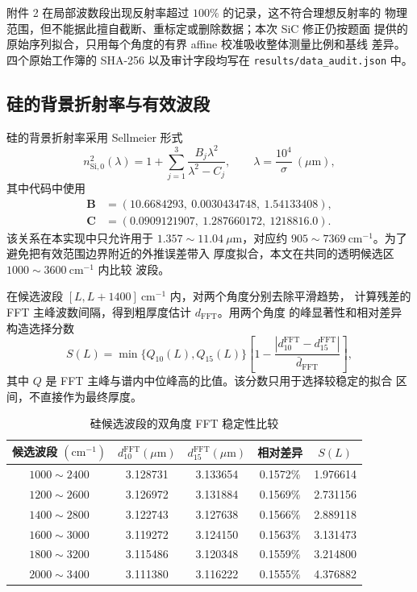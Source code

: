 \documentclass[UTF8,12pt,a4paper]{ctexart}
\begin{document}
附件 2 在局部波数段出现反射率超过 $100\%$ 的记录，这不符合理想反射率的
物理范围，但不能据此擅自截断、重标定或删除数据；本次 SiC 修正仍按题面
提供的原始序列拟合，只用每个角度的有界 affine 校准吸收整体测量比例和基线
差异。四个原始工作簿的 SHA-256 以及审计字段均写在
\verb|results/data_audit.json| 中。

\subsection{硅的背景折射率与有效波段}

硅的背景折射率采用 Sellmeier 形式
\begin{equation}
  n_{\mathrm{Si},0}^2(\lambda)=1+\sum_{j=1}^{3}
  \frac{B_j\lambda^2}{\lambda^2-C_j},
  \qquad \lambda=\frac{10^4}{\sigma}\ (\mu\mathrm{m}),
  \label{eq:sellmeier}
\end{equation}
其中代码中使用
\[
\begin{aligned}
\bm B&=(10.6684293,\ 0.0030434748,\ 1.54133408),\\
\bm C&=(0.0909121907,\ 1.287660172,\ 1218816.0).
\end{aligned}
\]
该关系在本实现中只允许用于 $1.357\sim11.04\ \mu\mathrm{m}$，对应约
$905\sim7369\ \mathrm{cm}^{-1}$。为了避免把有效范围边界附近的外推误差带入
厚度拟合，本文在共同的透明候选区 $1000\sim3600\ \mathrm{cm}^{-1}$ 内比较
波段。

在候选波段 $[L,L+1400]\ \mathrm{cm}^{-1}$ 内，对两个角度分别去除平滑趋势，
计算残差的 FFT 主峰波数间隔，得到粗厚度估计 $d_{\mathrm{FFT}}$。用两个角度
的峰显著性和相对差异构造选择分数
\begin{equation}
  S(L)=\min\{Q_{10}(L),Q_{15}(L)\}
  \left[1-\frac{|d_{10}^{\mathrm{FFT}}-d_{15}^{\mathrm{FFT}}|}
  {\bar d_{\mathrm{FFT}}}\right],
  \label{eq:band-score}
\end{equation}
其中 $Q$ 是 FFT 主峰与谱内中位峰高的比值。该分数只用于选择较稳定的拟合
区间，不直接作为最终厚度。

\begin{table}[H]
  \centering
  \caption{硅候选波段的双角度 FFT 稳定性比较}
  \label{tab:band}
  \small
  \setlength{\tabcolsep}{4pt}
  \begin{tabular}{ccccc}
    \toprule
    候选波段 $(\mathrm{cm}^{-1})$ & $d_{10}^{\mathrm{FFT}}(\mu\mathrm{m})$
    & $d_{15}^{\mathrm{FFT}}(\mu\mathrm{m})$ & 相对差异 & $S(L)$\\
    \midrule
    $1000\sim2400$ & 3.128731 & 3.133654 & 0.1572\% & 1.976614\\
    $1200\sim2600$ & 3.126972 & 3.131884 & 0.1569\% & 2.731156\\
    $1400\sim2800$ & 3.122743 & 3.127638 & 0.1566\% & 2.889118\\
    $1600\sim3000$ & 3.119272 & 3.124150 & 0.1563\% & 3.131473\\
    $1800\sim3200$ & 3.115486 & 3.120348 & 0.1559\% & 3.214800\\
    $2000\sim3400$ & 3.111380 & 3.116222 & 0.1555\% & 4.376882\\
    \bottomrule
  \end{tabular}
\end{table}
\end{document}
